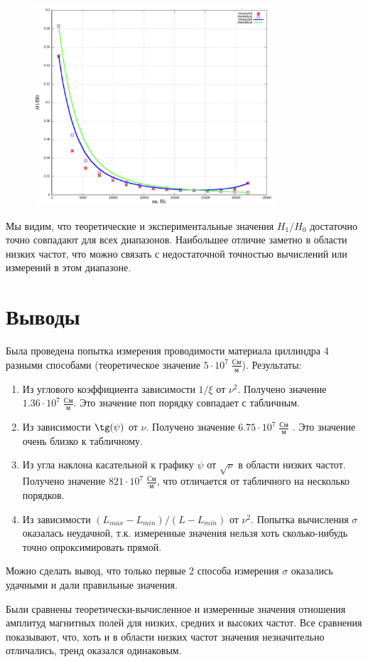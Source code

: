 \documentclass[11pt]{article}
\begin{document}
\begin{figure}[H]
    \centering
    \includegraphics[width=0.8\textwidth]{H-hight.png}
    \label{H-hight}
\end{figure}

Мы видим, что теоретические и экспериментальные значения \(H_1/H_0\) достаточно точно совпадают для всех диапазонов.
Наибольшее отличие заметно в области низких частот, что можно связать с недостаточной точностью вычислений или измерений в этом
диапазоне.


\section{Выводы}
Была проведена попытка измерения проводимости материала циллиндра 4 разными способами (теоретическое значение \( 5\cdot10^7\; \frac{См}{м} \)). Результаты:
\begin{enumerate}
    \item Из углового коэффициента зависимости \(1/\xi\) от \(\nu^2\). Получено значение \(1.36\cdot10^7\;\frac{См}{м}\). Это значение поп порядку
    совпадает с табличным.
    \item Из зависимости \( \tg(\psi) \) от \( \nu \). Получено значение \( 6.75\cdot10^7\; \frac{См}{м} \) . Это значение очень близко к табличному.
    \item Из угла наклона касательной к графику \( \psi \) от \(\sqrt{\nu}\) в области низких частот. Получено значение \( 821\cdot10^7\; \frac{См}{м} \),
    что отличается от табличного на несколько порядков.
    \item Из зависимости \( (L_{max} - L_{min})/(L - L_{min}) \) от \(\nu^2\). Попытка вычисления \(\sigma\) оказалась неудачной, т.к. измеренные значения
    нельзя хоть сколько-нибудь точно опроксимировать прямой.
\end{enumerate}
Можно сделать вывод, что только первые 2 способа измерения \(\sigma\) оказались удачными и дали правильные значения.

Были сравнены теоретически-вычисленное и измеренные значения отношения амплитуд магнитных полей для низких, средних и высоких частот.
Все сравнения показывают, что, хоть и в области низких частот значения незначительно отличались, тренд оказался одинаковым.
\end{document}
